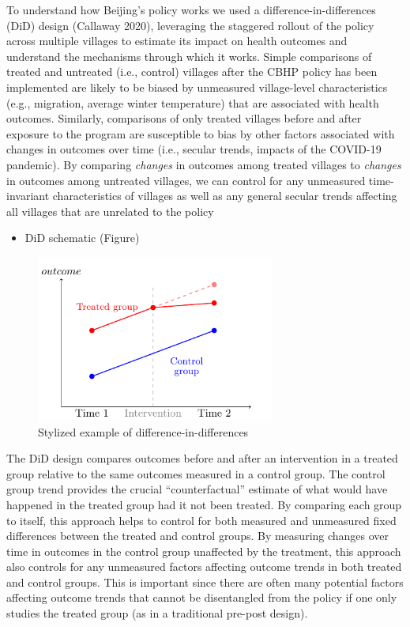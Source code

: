 \documentclass[
  letterpaper,
  DIV=11,
  numbers=noendperiod]{scrartcl}
\providecommand{\tightlist}{%
  \setlength{\itemsep}{0pt}\setlength{\parskip}{0pt}}\usepackage{longtable,booktabs,array}
\begin{document}
To understand how Beijing's policy works we used a
difference-in-differences (DiD) design (Callaway 2020), leveraging the
staggered rollout of the policy across multiple villages to estimate its
impact on health outcomes and understand the mechanisms through which it
works. Simple comparisons of treated and untreated (i.e., control)
villages after the CBHP policy has been implemented are likely to be
biased by unmeasured village-level characteristics (e.g., migration,
average winter temperature) that are associated with health outcomes.
Similarly, comparisons of only treated villages before and after
exposure to the program are susceptible to bias by other factors
associated with changes in outcomes over time (i.e., secular trends,
impacts of the COVID-19 pandemic). By comparing \emph{changes} in
outcomes among treated villages to \emph{changes} in outcomes among
untreated villages, we can control for any unmeasured time-invariant
characteristics of villages as well as any general secular trends
affecting all villages that are unrelated to the policy

\begin{itemize}
\tightlist
\item
  DiD schematic (Figure)
\end{itemize}

\begin{figure}

{\centering \includegraphics[width=0.7\textwidth,height=\textheight]{hei-report_files/figure-pdf/didfig-1.pdf}

}

\caption{Stylized example of difference-in-differences}

\end{figure}%

The DiD design compares outcomes before and after an intervention in a
treated group relative to the same outcomes measured in a control group.
The control group trend provides the crucial ``counterfactual'' estimate
of what would have happened in the treated group had it not been
treated. By comparing each group to itself, this approach helps to
control for both measured and unmeasured fixed differences between the
treated and control groups. By measuring changes over time in outcomes
in the control group unaffected by the treatment, this approach also
controls for any unmeasured factors affecting outcome trends in both
treated and control groups. This is important since there are often many
potential factors affecting outcome trends that cannot be disentangled
from the policy if one only studies the treated group (as in a
traditional pre-post design).
\end{document}
